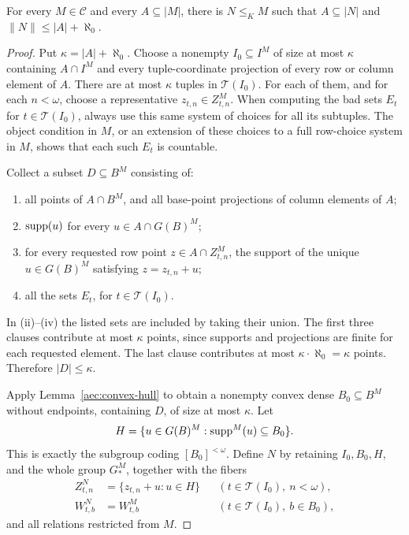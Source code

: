 \begin{lemma}\label{aec:ls}
For every \(M\in\mathcal C\) and every
\(A\subseteq |M|\), there is \(N\le_K M\) such that
\(A\subseteq |N|\) and
\(\|N\|\le |A|+\aleph_0\).
\end{lemma}

\begin{proof}
Put \(\kappa=|A|+\aleph_0\).
Choose a nonempty \(I_0\subseteq I^M\) of size
at most \(\kappa\) containing \(A\cap I^M\)
and every tuple-coordinate projection of every
row or column element of \(A\).
There are at most \(\kappa\) tuples in
\(\mathcal T(I_0)\).  For each of them, and for
each \(n<\omega\), choose a representative
\(z_{t,n}\in Z^M_{t,n}\).
When computing the bad sets \(E_t\) for
\(t\in\mathcal T(I_0)\), always use this same
system of choices for all its subtuples.
The object condition in \(M\), or an extension
of these choices to a full row-choice system
in \(M\), shows that each such \(E_t\) is
countable.

Collect a subset \(D\subseteq B^M\) consisting of:
\begin{enumerate}[label=\textup{(\roman*)}]
\item all points of \(A\cap B^M\), and all
base-point projections of column elements of \(A\);
\item \(\operatorname{supp}(u)\) for every
\(u\in A\cap G(B)^M\);
\item for every requested row point
\(z\in A\cap Z^M_{t,n}\), the support of the
unique \(u\in G(B)^M\) satisfying
\(z=z_{t,n}+u\);
\item all the sets \(E_t\), for
\(t\in\mathcal T(I_0)\).
\end{enumerate}
In (ii)--(iv) the listed sets are included by
taking their union.  The first three clauses
contribute at most \(\kappa\) points, since
supports and projections are finite for each
requested element.  The last clause contributes
at most \(\kappa\cdot\aleph_0=\kappa\)
points.  Therefore \(|D|\le\kappa\).

Apply Lemma~\ref{aec:convex-hull} to obtain a
nonempty convex dense \(B_0\subseteq B^M\)
without endpoints, containing \(D\), of size
at most \(\kappa\).
Let
\[
 H=\{u\in G(B)^M:\operatorname{supp}^M(u)\subseteq B_0\}.
\]
This is exactly the subgroup coding
\([B_0]^{<\omega}\).
Define \(N\) by retaining \(I_0,B_0,H\), and
the whole group \(G_*^M\), together with the
fibers
\begin{align*}
 Z^N_{t,n}&=\{z_{t,n}+u:u\in H\}
       &&(t\in\mathcal T(I_0),\ n<\omega),\\
 W^N_{t,b}&=W^M_{t,b}
       &&(t\in\mathcal T(I_0),\ b\in B_0),
\end{align*}
and all relations restricted from \(M\).


\end{proof}
